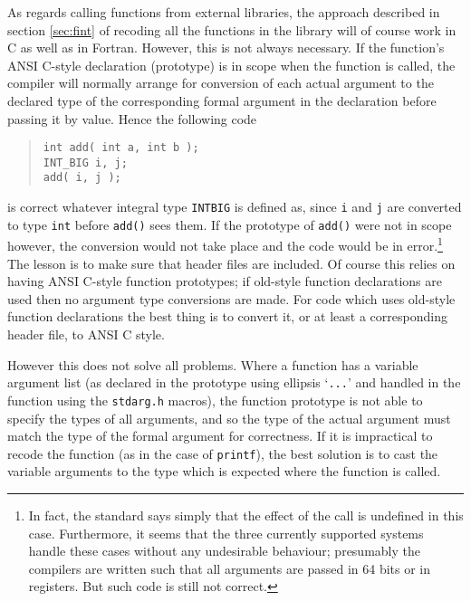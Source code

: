 \documentclass[twoside,11pt]{article}
\renewcommand{\_}{\texttt{\symbol{95}}}
\newcommand{\file}[1]{{\tt #1}}
\newcommand{\cc}[1]{{\tt #1}}
\newenvironment{squote}{\begin{quote}\begin{small}}{\end{small}\end{quote}}
\begin{document}
As regards calling functions from external libraries,
the approach described in section \ref{sec:fint} of 
recoding all the functions in the library will of course work in C
as well as in Fortran.
However, this is not always necessary.
If the function's ANSI C-style declaration (prototype) is in scope when 
the function is called,
the compiler will normally arrange for conversion
of each actual argument to the declared type of
the corresponding formal argument in the declaration 
before passing it by value.
Hence the following code
\begin{squote}
\begin{verbatim}
int add( int a, int b );
INT_BIG i, j;
add( i, j );
\end{verbatim}
\end{squote}
is correct whatever integral type \cc{INT\_BIG} is defined as, 
since \cc{i} and \cc{j} are converted to type \cc{int}
before \cc{add()} sees them.
If the prototype of \cc{add()} were not in scope however,
the conversion would not take place and the code would be
in error.\footnote{
   In fact, the standard says simply that the effect of the call is
   undefined in this case.  Furthermore, it seems that the three
   currently supported systems handle these cases without
   any undesirable behaviour; presumably the compilers are written
   such that all arguments are passed in 64 bits or in registers.
   But such code is still not correct.
}
The lesson is to make sure that header files are
included.
Of course this relies on having ANSI C-style function prototypes;
if old-style function declarations are used then no argument type
conversions are made.  For code which uses old-style function 
declarations the best thing is to convert it, 
or at least a corresponding header file, 
to ANSI C style.

However this does not solve all problems.
Where a function has a variable argument list
(as declared in the prototype using ellipsis `\cc{...}'
and handled in the function using the \file{stdarg.h} macros), 
the function prototype
is not able to specify the types of all arguments,
and so the type of the actual argument must match the type of
the formal argument for correctness.  If it is impractical
to recode the function (as in the case of \cc{printf}),
the best solution is to cast the variable arguments to the type
which is expected where the function is called.
\end{document}
